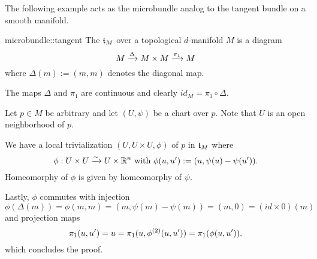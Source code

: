 \begin{myparagraph}
    The following example acts as the microbundle analog to the tangent bundle on a smooth manifold.
\end{myparagraph}

\begin{myexample}{microbundle::tangent}
    The  $\mathfrak{t}_M$ over a topological $d$-manifold $M$ is a diagram
    \[ M \xrightarrow{\Delta} M \times M \xrightarrow{\pi_1} M{} \]
    where $\Delta(m) := (m, m)$ denotes the diagonal map.
\end{myexample}

\begin{myproof}
    The maps $\Delta$ and $\pi_1$ are continuous and clearly $id_M = \pi_1 \circ \Delta$.

    Let $p \in M$ be arbitrary and let $(U, \psi)$ be a chart over $p$.
    Note that $U$ is an open neighborhood of $p$.
    
    We have a local trivialization $(U, U \times U, \phi)$ of $p$ in $\mathfrak{t}_M$ where
    \[ \phi: U \times U \xrightarrow{\sim} U \times \mathbb{R}^n \text{ with } \phi(u, u') := (u, \psi(u) - \psi(u')). \]
    Homeomorphy of $\phi$ is given by homeomorphy of $\psi$.

    Lastly, $\phi$ commutes with injection
    \[ \phi(\Delta(m)) = \phi(m, m) = (m, \psi(m) - \psi(m)) = (m, 0) = (id \times 0)(m)\]
    and projection maps
    \[ \pi_1(u, u') = u = \pi_1(u, \phi^{(2)}(u, u')) = \pi_1(\phi(u, u')). \]
    which concludes the proof.
\end{myproof}